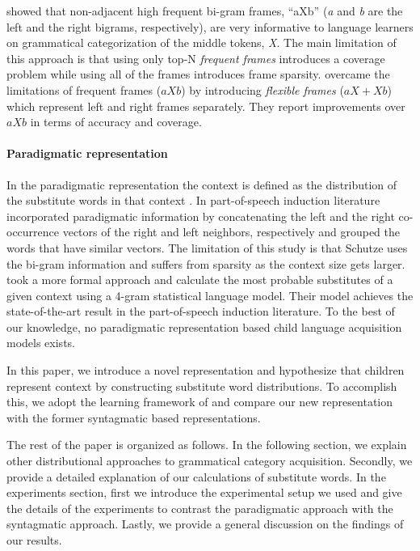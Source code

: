 \cite{Mintz200391} showed that non-adjacent high frequent bi-gram frames,
``aXb'' ({\it a} and {\it b} are the left and the right bigrams, respectively),
are very informative to language learners on grammatical categorization of
the middle tokens, {\it X}.  The main limitation of this approach is that using
only top-N {\it frequent frames} introduces a coverage problem while using all of
the frames introduces frame sparsity.  \cite{clair2010} overcame the
limitations of frequent frames ($aXb$) by introducing {\it flexible frames}
($aX+Xb$) which represent left and right frames separately.  They report
improvements over $aXb$ in terms of accuracy and coverage.  

\paragraph {Paradigmatic representation}

In the paradigmatic representation the context is defined as the distribution
of the substitute words in that context \citep*{SchutzePe93, Schutze1995,
YatbazSY12}.   In part-of-speech induction literature \cite{Schutze1995}
incorporated paradigmatic information by concatenating the left and the right
co-occurrence vectors of the right and left neighbors, respectively and grouped
the words that have similar vectors.  The limitation of this study is that Schutze
uses the bi-gram information and suffers from sparsity as the context
size gets larger.  \cite{YatbazSY12} took a more formal approach and
calculate the most probable substitutes of a given context using a 4-gram
statistical language model.  Their model achieves the state-of-the-art result
in the part-of-speech induction literature.  To the best of our knowledge,
no paradigmatic representation based child language acquisition
models exists.  

In this paper, we introduce a novel representation and hypothesize that
children represent context by constructing substitute word distributions.  To
accomplish this, we adopt the learning framework of \citep*{clair2010} and
compare our new representation with the former syntagmatic based
representations. 

The rest of the paper is organized as follows. In the following section, we explain other
distributional approaches to grammatical category acquisition. Secondly, we provide
a detailed explanation of our calculations of substitute words. In the experiments section,
first we introduce the experimental setup we used and give the details of the experiments
to contrast the paradigmatic approach with the syntagmatic approach. Lastly, we provide a
general discussion on the findings of our results. 
